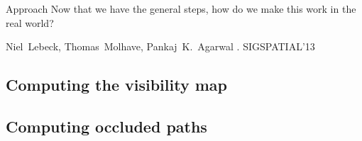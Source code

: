 \begin{frame}{Approach}
	\centering\Large
	Now that we have the general steps, how do we make this work in the real world?

	\begin{thebibliography}{10}
		\beamertemplatearticlebibitems
			Niel~Lebeck, Thomas~M\-olhave, Pankaj~K.~Agarwal
		.
		\newblock SIGSPATIAL'13
	\end{thebibliography}
\end{frame}

\subsection{Computing the visibility map}


\subsection{Computing occluded paths}

